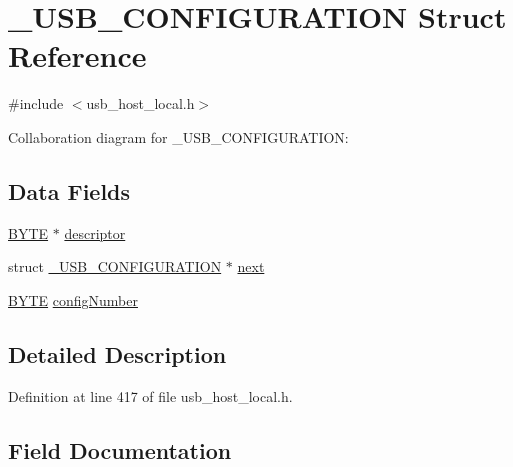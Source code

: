 \hypertarget{struct___u_s_b___c_o_n_f_i_g_u_r_a_t_i_o_n}{}\section{\+\_\+\+U\+S\+B\+\_\+\+C\+O\+N\+F\+I\+G\+U\+R\+A\+T\+I\+O\+N Struct Reference}
\label{struct___u_s_b___c_o_n_f_i_g_u_r_a_t_i_o_n}


{\ttfamily \#include $<$usb\+\_\+host\+\_\+local.\+h$>$}



Collaboration diagram for \+\_\+\+U\+S\+B\+\_\+\+C\+O\+N\+F\+I\+G\+U\+R\+A\+T\+I\+O\+N\+:
\subsection*{Data Fields}
\begin{DoxyCompactItemize}
\item 
\hyperlink{_generic_type_defs_8h_a4ae1dab0fb4b072a66584546209e7d58}{B\+Y\+T\+E} $\ast$ \hyperlink{struct___u_s_b___c_o_n_f_i_g_u_r_a_t_i_o_n_ad9d15342c1363ab2657844da30a05bb0}{descriptor}
\item 
struct \hyperlink{struct___u_s_b___c_o_n_f_i_g_u_r_a_t_i_o_n}{\+\_\+\+U\+S\+B\+\_\+\+C\+O\+N\+F\+I\+G\+U\+R\+A\+T\+I\+O\+N} $\ast$ \hyperlink{struct___u_s_b___c_o_n_f_i_g_u_r_a_t_i_o_n_a230b8d7f81f5b4d0961b5214977cf6b4}{next}
\item 
\hyperlink{_generic_type_defs_8h_a4ae1dab0fb4b072a66584546209e7d58}{B\+Y\+T\+E} \hyperlink{struct___u_s_b___c_o_n_f_i_g_u_r_a_t_i_o_n_acbfe044246f8584a96399a81fe826dd8}{config\+Number}
\end{DoxyCompactItemize}


\subsection{Detailed Description}


Definition at line 417 of file usb\+\_\+host\+\_\+local.\+h.



\subsection{Field Documentation}
\hypertarget{struct___u_s_b___c_o_n_f_i_g_u_r_a_t_i_o_n_acbfe044246f8584a96399a81fe826dd8}{}
